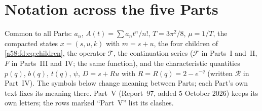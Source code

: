 \documentclass[11pt,letterpaper]{article}
\theoremstyle{remark}
\newcommand{\TT}{\mathcal T}
\begin{document}
\section*{Notation across the five Parts}\label{a58:sec:notation}
Common to all Parts: $a_n$, $A(t)=\sum a_nt^n/n!$, $T=3\pi^2/8$, $\mu=1/T$, the compacted states $x=(s,u,k)$ with $m=s+u$, the four children of \eqref{a58:fd:eq:children}, the operator $\TT$, the continuation series ($\mathcal F$ in Parts~I and~II, $F$ in Parts~III and~IV; the same function), and the characteristic quantities $p(q)$, $b(q)$, $t(q)$, $\psi$, $D=s+Ru$ with $R=R(q)=2-e^{-q}$ (written $\mathcal R$ in Part~IV). The symbols below change meaning between Parts; each Part's own text fixes its meaning there. Part~V (Report~97, added 5 October 2026) keeps its own letters; the rows marked ``Part~V'' list its clashes.
\end{document}
